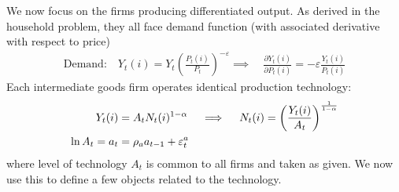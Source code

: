 \documentclass[12pt]{article}
\theoremstyle{plain}
\theoremstyle{definition}
\theoremstyle{remark}
\begin{document}
We now focus on the firms producing differentiated output.
As derived in the household problem, they all face demand function
(with associated derivative with respect to price)
\begin{align}
  \text{Demand:}\quad
  Y_t(i) = Y_t\left(\frac{P_t(i)}{P_t}\right)^{-\varepsilon}
  \implies\quad
  \frac{\partial Y_t(i)}{\partial P_t(i)}
  =
  -\varepsilon
  \frac{Y_t(i)}{P_t(i)}
  \label{nkdemand}
\end{align}
Each intermediate goods firm operates identical production technology:
\begin{align}
  Y_t(i) &= A_t N_t(i)^{1-\alpha}
  \quad\implies\quad
  N_t(i) = \left(\frac{Y_t(i)}{A_t}\right)^{\frac{1}{1-\alpha}}
  \label{nklabor}
  \\
  \ln A_t = a_t &= \rho_a a_{t-1} + \varepsilon_t^a
  \notag
\end{align}
where level of technology $A_t$ is common to all firms and taken as
given.
We now use this to define a few objects related to the technology.
\end{document}
